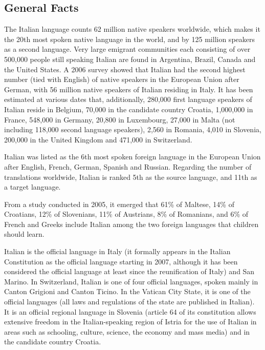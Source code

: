 \clearpage


\begin{multicols}{2}

\subsection{General Facts}

The Italian language counts 62 million native speakers worldwide,
which makes it the 20th most spoken native language in the world, and
by 125 million speakers as a second language. Very large emigrant
communities each consisting of over 500,000 people still speaking
Italian are found in Argentina, Brazil, Canada and the United
States. A 2006 survey showed that Italian had the second highest
number (tied with English) of native speakers in the European Union
after German, with 56 million native speakers of Italian residing in
Italy. It has been estimated at various dates that, additionally, 280,000
first language speakers of Italian reside in Belgium, 70,000 in the
candidate country Croatia, 1,000,000 in France, 548,000 in Germany,
20,800 in Luxembourg, 27,000 in Malta (not including 118,000 second
language speakers), 2,560 in Romania, 4,010 in Slovenia, 200,000 in
the United Kingdom and 471,000 in Switzerland.



Italian was listed as the 6th most spoken foreign language in the European
Union after English, French, German, Spanish and Russian. Regarding the number
of translations worldwide, Italian is ranked 5th as the source language, and
11th as a target language.


From a study conducted in 2005, it emerged that 61\% of Maltese, 14\% of
Croatians, 12\% of Slovenians, 11\% of Austrians, 8\% of Romanians, and 6\% of
French and Greeks include Italian among the two foreign languages that
children should learn.

Italian is the official language in Italy (it formally appears in the Italian
Constitution as the official language starting in 2007, although it has been
considered the official language at least since the reunification of Italy)
and San Marino. In Switzerland, Italian is one of four official languages,
spoken mainly in Canton Grigioni and Canton Ticino. In the Vatican City State,
it is one of the official languages (all laws and regulations of the state are
published in Italian). It is an official regional language in Slovenia
(article 64 of its constitution allows extensive freedom in the
Italian-speaking region of Istria for the use of Italian in areas such as
schooling, culture, science, the economy and mass media) and in the candidate
country Croatia.


\end{multicols}
